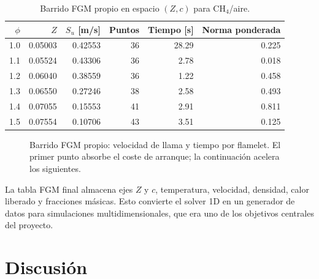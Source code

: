 \documentclass[12pt,a4paper]{article}
\begin{document}
\begin{table}[H]
  \centering
  \caption{Barrido FGM propio en espacio $(Z,c)$ para CH$_4$/aire.}
  \label{tab:fgm}
  \small
  \begin{tabular}{rrrrrr}
    \toprule
    $\phi$ & $Z$ & $S_u$ [m/s] & Puntos & Tiempo [s] & Norma ponderada\\
    \midrule
    1.0 & 0.05003 & 0.42553 & 36 & 28.29 & 0.225\\
    1.1 & 0.05524 & 0.43306 & 36 & 2.78 & 0.018\\
    1.2 & 0.06040 & 0.38559 & 36 & 1.22 & 0.458\\
    1.3 & 0.06550 & 0.27246 & 38 & 2.58 & 0.493\\
    1.4 & 0.07055 & 0.15553 & 41 & 2.91 & 0.811\\
    1.5 & 0.07554 & 0.10706 & 43 & 3.51 & 0.125\\
    \bottomrule
  \end{tabular}
\end{table}

\begin{figure}[H]
  \centering
  \caption{Barrido FGM propio: velocidad de llama y tiempo por flamelet. El primer punto absorbe el coste de arranque; la continuación acelera los siguientes.}
  \label{fig:fgm_sweep}
\end{figure}

La tabla FGM final almacena ejes $Z$ y $c$, temperatura, velocidad, densidad, calor liberado y fracciones másicas. Esto convierte el solver 1D en un generador de datos para simulaciones multidimensionales, que era uno de los objetivos centrales del proyecto.

\section{Discusión}
\end{document}

